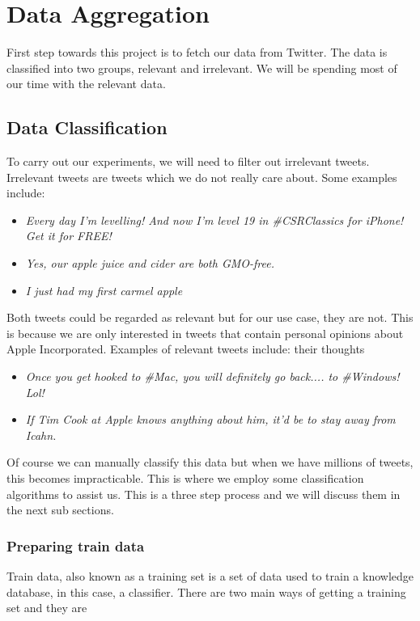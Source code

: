 
\chapter{Data Aggregation}
First step towards this project is to fetch our data from Twitter. The data is classified into two
groups, relevant and irrelevant. We will be spending most of our time with the relevant data.


\section{Data Classification}
To carry out our experiments, we will need to filter out irrelevant tweets. Irrelevant tweets are
tweets which we do not really care about. Some examples include:

\begin{itemize}
  \item \textit{Every day I'm levelling! And now I'm level 19 in \#CSRClassics for iPhone! Get it for FREE!}
  \item \textit{Yes, our apple juice and cider are both GMO-free.}
  \item \textit{I just had my first carmel apple}
\end{itemize}

Both tweets could be regarded as relevant but for our use case, they are not. This is because we are
only interested in tweets that contain personal opinions about Apple Incorporated. Examples of
relevant tweets include:
their thoughts
\begin{itemize}
  \item \textit{Once you get hooked to \#Mac, you will definitely go back.... to \#Windows! Lol!}
  \item \textit{If Tim Cook at Apple knows anything about him, it'd be to stay away from Icahn.}
\end{itemize}

Of course we can manually classify this data but when we have millions of tweets, this becomes
impracticable. This is where we employ some classification algorithms to assist us. This is a
three step process and we will discuss them in the next sub sections.

\subsection{Preparing train data}
Train data, also known as a training set is a set of data used to train a knowledge database, in
this case, a classifier. There are two main ways of getting a training set and they are

